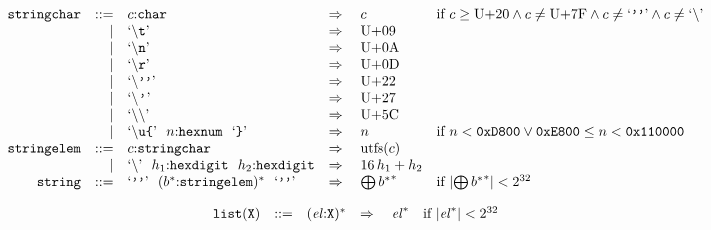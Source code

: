 $$
\begin{array}[t]{@{}lrrl@{}l@{}l@{}l@{}}
& {\mathtt{stringchar}} & ::= & c{:}{\mathtt{char}} & \quad\Rightarrow\quad{} & c & \quad \mbox{if}~ c \geq \mathrm{U{+}20} \land c \neq \mathrm{U{+}7F} \land c \neq \mbox{‘\texttt{\kern-0.02em{'}\kern-0.05em{'}\kern-0.02em}’} \land c \neq \mbox{‘\texttt{\(\mathtt{\backslash}\)}’} \\
& & | & \mbox{‘\texttt{\(\mathtt{\backslash}\)t}’} & \quad\Rightarrow\quad{} & \mathrm{U{+}09} \\
& & | & \mbox{‘\texttt{\(\mathtt{\backslash}\)n}’} & \quad\Rightarrow\quad{} & \mathrm{U{+}0A} \\
& & | & \mbox{‘\texttt{\(\mathtt{\backslash}\)r}’} & \quad\Rightarrow\quad{} & \mathrm{U{+}0D} \\
& & | & \mbox{‘\texttt{\(\mathtt{\backslash}\)\kern-0.02em{'}\kern-0.05em{'}\kern-0.02em}’} & \quad\Rightarrow\quad{} & \mathrm{U{+}22} \\
& & | & \mbox{‘\texttt{\(\mathtt{\backslash}\)\kern0.03em{'}\kern0.03em}’} & \quad\Rightarrow\quad{} & \mathrm{U{+}27} \\
& & | & \mbox{‘\texttt{\(\mathtt{\backslash}\)\(\mathtt{\backslash}\)}’} & \quad\Rightarrow\quad{} & \mathrm{U{+}5C} \\
& & | & \mbox{‘\texttt{\(\mathtt{\backslash}\)u{\{}}’}~~n{:}{\mathtt{hexnum}}~~\mbox{‘\texttt{{\}}}’} & \quad\Rightarrow\quad{} & n & \quad \mbox{if}~ n < \mathtt{0xD800} \lor \mathtt{0xE800} \leq n < \mathtt{0x110000} \\
& {\mathtt{stringelem}} & ::= & c{:}{\mathtt{stringchar}} & \quad\Rightarrow\quad{} & {\mathrm{utf{\kern-0.1em\scriptstyle 8}}}(c) \\
& & | & \mbox{‘\texttt{\(\mathtt{\backslash}\)}’}~~h_1{:}{\mathtt{hexdigit}}~~h_2{:}{\mathtt{hexdigit}} & \quad\Rightarrow\quad{} & 16 \, h_1 + h_2 \\
& {\mathtt{string}} & ::= & \mbox{‘\texttt{\kern-0.02em{'}\kern-0.05em{'}\kern-0.02em}’}~~{({b^\ast}{:}{\mathtt{stringelem}})^\ast}~~\mbox{‘\texttt{\kern-0.02em{'}\kern-0.05em{'}\kern-0.02em}’} & \quad\Rightarrow\quad{} & {\bigoplus}\, {{b^\ast}^\ast} & \quad \mbox{if}~ {|{\bigoplus}\, {{b^\ast}^\ast}|} < {2^{32}} \\
\end{array}
$$

\vspace{1ex}

$$
\begin{array}[t]{@{}lrrl@{}l@{}l@{}l@{}}
& {\mathtt{list}}({\mathtt{X}}) & ::= & {({\mathit{el}}{:}{\mathtt{X}})^\ast} & \quad\Rightarrow\quad{} & {{\mathit{el}}^\ast} & \quad \mbox{if}~ {|{{\mathit{el}}^\ast}|} < {2^{32}} \\
\end{array}
$$

